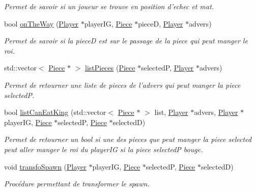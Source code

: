 \begin{DoxyCompactItemize}
\begin{DoxyCompactList}\small\item\em Permet de savoir si un joueur se trouve en position d'echec et mat. \end{DoxyCompactList}\item 
bool \hyperlink{class_chess_a7b2dde25a7cbe133dbb0fa9e71909e8f}{on\-The\-Way} (\hyperlink{class_player}{Player} $\ast$player\-I\-G, \hyperlink{class_piece}{Piece} $\ast$piece\-D, \hyperlink{class_player}{Player} $\ast$advers)
\begin{DoxyCompactList}\small\item\em Permet de savoir si la piece\-D est sur le passage de la piece qui peut manger le roi. \end{DoxyCompactList}\item 
std\-::vector$<$ \hyperlink{class_piece}{Piece} $\ast$ $>$ \hyperlink{class_chess_ac70f9b16162244c5ab75e93b52db2024}{list\-Pieces} (\hyperlink{class_piece}{Piece} $\ast$selected\-P, \hyperlink{class_player}{Player} $\ast$advers)
\begin{DoxyCompactList}\small\item\em Permet de retourner une liste de pieces de l'advers qui peut manger la piece selected\-P. \end{DoxyCompactList}\item 
bool \hyperlink{class_chess_a860115fe5245b5d361ccb3ce7ea545b6}{list\-Can\-Eat\-King} (std\-::vector$<$ \hyperlink{class_piece}{Piece} $\ast$ $>$ list, \hyperlink{class_player}{Player} $\ast$advers, \hyperlink{class_player}{Player} $\ast$player\-I\-G, \hyperlink{class_piece}{Piece} $\ast$selected\-P, \hyperlink{class_piece}{Piece} $\ast$selected\-D)
\begin{DoxyCompactList}\small\item\em Permet de retourner un bool si une des pieces que peut manger la piece selected peut aller manger le roi du player\-I\-G si la piece selected\-P bouge. \end{DoxyCompactList}\item 
void \hyperlink{class_chess_a29329920258b662de0bdac41ba547f57}{transfo\-Spawn} (\hyperlink{class_player}{Player} $\ast$player\-I\-G, \hyperlink{class_piece}{Piece} $\ast$selected\-P, \hyperlink{class_piece}{Piece} $\ast$selected\-D)
\begin{DoxyCompactList}\small\item\em Procédure permettant de transformer le spawn. \end{DoxyCompactList}\item 

\end{DoxyCompactItemize}
